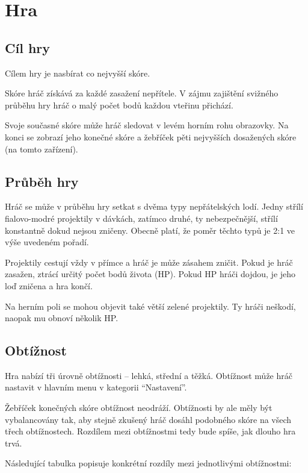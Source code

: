 \documentclass[12pt,a4paper,hidelinks]{article}
\begin{document}
\section{Hra}
\subsection{Cíl hry}
Cílem hry je nasbírat co nejvyšší skóre.

Skóre hráč získává za každé zasažení nepřítele. V zájmu zajištění svižného průběhu hry hráč o malý počet bodů každou vteřinu přichází.

Svoje současné skóre může hráč sledovat v levém horním rohu obrazovky. Na konci se zobrazí jeho konečné skóre a žebříček pěti nejvyšších dosažených skóre (na tomto zařízení).
\subsection{Průběh hry}
Hráč se může v průběhu hry setkat s dvěma typy nepřátelských lodí. Jedny střílí fialovo-modré projektily v dávkách, zatímco druhé, ty nebezpečnější, střílí konstantně dokud nejsou zničeny. Obecně platí, že poměr těchto typů je 2:1 ve výše uvedeném pořadí.

Projektily cestují vždy v přímce a hráč je může zásahem zničit. Pokud je hráč zasažen, ztrácí určitý počet bodů života (HP). Pokud HP hráči dojdou, je jeho loď zničena a hra končí.

Na herním poli se mohou objevit také větší zelené projektily. Ty hráči neškodí, naopak mu obnoví několik HP.

\subsection{Obtížnost}
Hra nabízí tři úrovně obtížnosti -- lehká, střední a těžká. Obtížnost může hráč nastavit v hlavním menu v kategorii \enquote{Nastavení}.

Žebříček konečných skóre obtížnost neodráží. Obtížnosti by ale měly být vybalancovány tak, aby stejně zkušený hráč dosáhl podobného skóre na všech třech obtížnostech. Rozdílem mezi obtížnostmi tedy bude spíše, jak dlouho hra trvá.

Následující tabulka popisuje konkrétní rozdíly mezi jednotlivými obtížnostmi:
\end{document}
